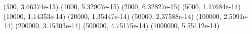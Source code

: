(500, 3.66374e-15) (1000, 5.32907e-15) (2000, 6.32827e-15) (5000, 1.17684e-14) (10000, 1.14353e-14) (20000, 1.35447e-14) (50000, 2.37588e-14) (100000, 2.5091e-14) (200000, 3.15303e-14) (500000, 4.75175e-14) (1000000, 5.55112e-14) 